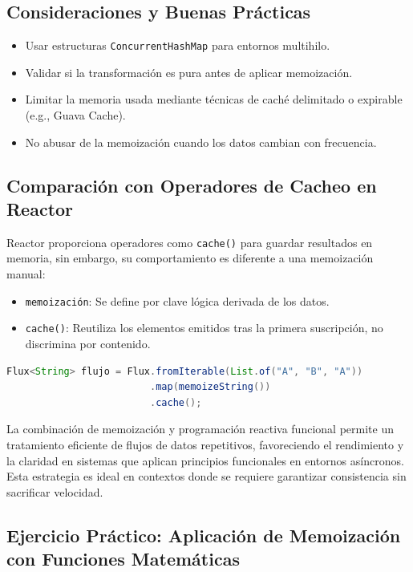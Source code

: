 \subsection{Consideraciones y Buenas Prácticas}

\begin{itemize}
    \item Usar estructuras \texttt{ConcurrentHashMap} para entornos multihilo.
    \item Validar si la transformación es pura antes de aplicar memoización.
    \item Limitar la memoria usada mediante técnicas de caché delimitado o expirable (e.g., Guava Cache).
    \item No abusar de la memoización cuando los datos cambian con frecuencia.
\end{itemize}

\subsection{Comparación con Operadores de Cacheo en Reactor}

Reactor proporciona operadores como \texttt{cache()} para guardar resultados en memoria, sin embargo, su comportamiento es diferente a una memoización manual:

\begin{itemize}
    \item \texttt{memoización}: Se define por clave lógica derivada de los datos.
    \item \texttt{cache()}: Reutiliza los elementos emitidos tras la primera suscripción, no discrimina por contenido.
\end{itemize}

\begin{lstlisting}[language=Java]
Flux<String> flujo = Flux.fromIterable(List.of("A", "B", "A"))
                         .map(memoizeString())
                         .cache(); 
\end{lstlisting}

La combinación de memoización y programación reactiva funcional permite un tratamiento eficiente de flujos de datos repetitivos, favoreciendo el rendimiento y la claridad en sistemas que aplican principios funcionales en entornos asíncronos. Esta estrategia es ideal en contextos donde se requiere garantizar consistencia sin sacrificar velocidad.

\subsection{Ejercicio Práctico: Aplicación de Memoización con Funciones Matemáticas}

